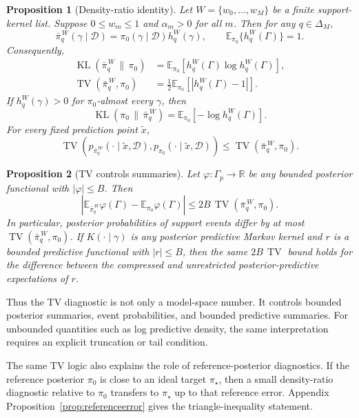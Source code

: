 \documentclass[twoside,11pt]{article}
\newtheorem{proposition}{Proposition}
\newcommand{\D}{\mathcal{D}}
\newcommand{\E}{\mathbb{E}}
\newcommand{\TV}{\operatorname{TV}}
\newcommand{\KL}{\operatorname{KL}}
\begin{document}
\begin{proposition}[Density-ratio identity]
\label{prop:kernelidentity}
Let \(W=\{w_0,\dots,w_M\}\) be a finite support-kernel list. Suppose \(0\le w_m\le1\) and \(\alpha_m>0\) for all \(m\). Then for any \(q\in\Delta_M\),
\[
\bar\pi_q^{\,W}(\gamma\mid\D)=\pi_0(\gamma\mid\D)h_q^W(\gamma), \qquad \E_{\pi_0}\{h_q^W(\Gamma)\}=1.
\]
Consequently,
\begin{align}
\KL(\bar\pi_q^{\,W}\,\|\,\pi_0)&=\E_{\pi_0}\!\left[h_q^W(\Gamma)\log h_q^W(\Gamma)\right], \label{eq:kernelRKL}\\
\TV(\bar\pi_q^{\,W},\pi_0)&=\frac12\E_{\pi_0}\!\left[|h_q^W(\Gamma)-1|\right]. \label{eq:kernelTV}
\end{align}
If $h_q^W(\gamma)>0$ for $\pi_0$-almost every $\gamma$, then
\begin{equation}
\KL(\pi_0\,\|\,\bar\pi_q^{\,W}) = \E_{\pi_0}\!\left[-\log h_q^W(\Gamma)\right]. \label{eq:kernelFKL}
\end{equation}
For every fixed prediction point $\tilde x$,
\[
\TV\!\left(p_{\bar\pi_q^{\,W}}(\cdot\mid\tilde x,\D), p_{\pi_0}(\cdot\mid\tilde x,\D)\right) \le \TV(\bar\pi_q^{\,W},\pi_0).
\]
\end{proposition}

\begin{proposition}[TV controls summaries]
\label{prop:functionalconsequence}
Let \(\varphi:\Gamma_p\to\mathbb R\) be any bounded posterior functional with \(|\varphi|\le B\). Then
\[
\left| \E_{\bar\pi_q^{\,W}}\varphi(\Gamma) - \E_{\pi_0}\varphi(\Gamma) \right| \le 2B\,\TV(\bar\pi_q^{\,W},\pi_0).
\]
In particular, posterior probabilities of support events differ by at most \(\TV(\bar\pi_q^{\,W},\pi_0)\). If \(K(\cdot\mid\gamma)\) is any posterior predictive Markov kernel and \(r\) is a bounded predictive functional with \(|r|\le B\), then the same \(2B\,\TV\) bound holds for the difference between the compressed and unrestricted posterior-predictive expectations of \(r\).
\end{proposition}

Thus the TV diagnostic is not only a model-space number. It controls bounded posterior summaries, event probabilities, and bounded predictive summaries. For unbounded quantities such as log predictive density, the same interpretation requires an explicit truncation or tail condition.

The same TV logic also explains the role of reference-posterior diagnostics. If the reference posterior \(\pi_0\) is close to an ideal target \(\pi_\star\), then a small density-ratio diagnostic relative to \(\pi_0\) transfers to \(\pi_\star\) up to that reference error. Appendix Proposition~\ref{prop:referenceerror} gives the triangle-inequality statement.
\end{document}
